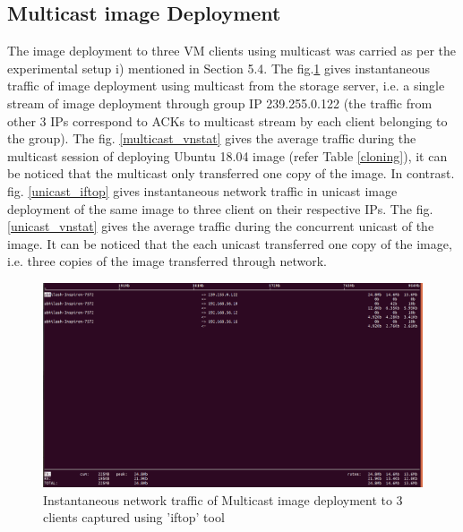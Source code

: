 \documentclass[a4paper,12pt]{article}
\begin{document}
\subsection{ Multicast image Deployment}
The image deployment to three VM clients using multicast was carried as per the experimental setup i) mentioned in Section 5.4. The fig.\ref{multicast_iftop} gives instantaneous traffic of image deployment using multicast from the storage server, i.e. a single stream of image deployment through group IP 239.255.0.122 (the traffic from other 3 IPs correspond to ACKs to multicast stream by each client belonging to the group). The fig. \ref{multicast_vnstat} gives the average traffic during the multicast session of deploying Ubuntu 18.04 image (refer Table \ref{cloning}), it can be noticed that the multicast only transferred one copy of the image. In contrast. fig. \ref{unicast_iftop} gives instantaneous network traffic in unicast image deployment of the same image to three client on their respective IPs. The fig. \ref{unicast_vnstat} gives the average traffic during the concurrent unicast of the image. It can be noticed that the each unicast transferred one copy of the image, i.e. three copies of the image transferred through network.

\begin{figure}
\centering
  \includegraphics[width=1\linewidth]{multicast_3_iftop.png}
  \caption{Instantaneous network traffic of Multicast image deployment to 3 clients captured using 'iftop'\cite{iftop} tool}
  \label{multicast_iftop}
\end{figure}
\end{document}
